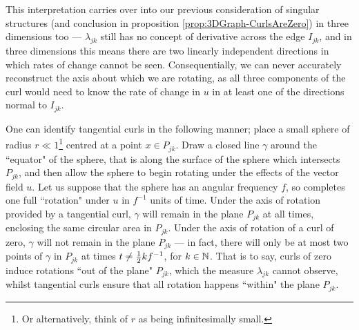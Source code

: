 This interpretation carries over into our previous consideration of singular structures (and conclusion in proposition \ref{prop:3DGraph-CurlsAreZero}) in three dimensions too ---  $\lambda_{jk}$ still has no concept of derivative across the edge $I_{jk}$, and in three dimensions this means there are two linearly independent directions in which rates of change cannot be seen.
Consequentially, we can never accurately reconstruct the axis about which we are rotating, as all three components of the curl would need to know the rate of change in $u$ in at least one of the directions normal to $I_{jk}$.

One can identify tangential curls in the following manner; place a small sphere of radius $r\ll 1$\footnote{Or alternatively, think of $r$ as being infinitesimally small.} centred at a point $x\in P_{jk}$.
Draw a closed line $\gamma$ around the ``equator" of the sphere, that is along the surface of the sphere which intersects $P_{jk}$, and then allow the sphere to begin rotating under the effects of the vector field $u$.
Let us suppose that the sphere has an angular frequency $f$, so completes one full ``rotation" under $u$ in $f^{-1}$ units of time.
Under the axis of rotation provided by a tangential curl, $\gamma$ will remain in the plane $P_{jk}$ at all times, enclosing the same circular area in $P_{jk}$.
Under the axis of rotation of a curl of zero, $\gamma$ will not remain in the plane $P_{jk}$ --- in fact, there will only be at most two points of $\gamma$ in $P_{jk}$ at times $t\neq \frac{1}{2}kf^{-1}$, for $k\in\mathbb{N}$.
That is to say, curls of zero induce rotations ``out of the plane" $P_{jk}$, which the measure $\lambda_{jk}$ cannot observe, whilst tangential curls ensure that all rotation happens ``within" the plane $P_{jk}$.